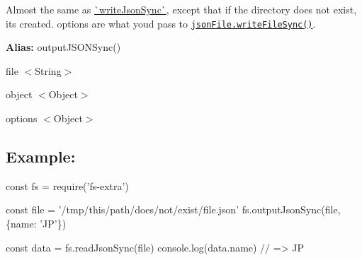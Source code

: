Almost the same as \mbox{\hyperlink{write_json-sync_8md}{\`{}write\+Json\+Sync\`{}}}, except that if the directory does not exist, it\textquotesingle{}s created. {\ttfamily options} are what you\textquotesingle{}d pass to \href{https://github.com/jprichardson/node-jsonfile#writefilesyncfilename-obj-options}{\tt {\ttfamily json\+File.\+write\+File\+Sync()}}.

{\bfseries Alias\+:} {\ttfamily output\+J\+S\+O\+N\+Sync()}


\begin{DoxyItemize}
\item {\ttfamily file} {\ttfamily $<$String$>$}
\item {\ttfamily object} {\ttfamily $<$Object$>$}
\item {\ttfamily options} {\ttfamily $<$Object$>$}
\end{DoxyItemize}

\subsection*{Example\+:}


\begin{DoxyCode}
const fs = require('fs-extra')

const file = '/tmp/this/path/does/not/exist/file.json'
fs.outputJsonSync(file, \{name: 'JP'\})

const data = fs.readJsonSync(file)
console.log(data.name) // => JP
\end{DoxyCode}
 